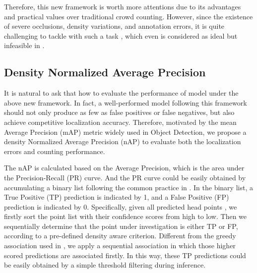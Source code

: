 \documentclass[10pt,twocolumn,letterpaper]{article}
\begin{document}
Therefore, this new framework is worth more attentions due to its advantages and practical values over traditional crowd counting. However, since the existence of severe occlusions, density variations, and annotation errors, it is quite challenging to tackle with such a task \cite{liu2019recurrent,liu2019point,sam2020locate}, which even is considered as ideal but infeasible in \cite{idrees2018composition}. 
\subsection{Density Normalized Average Precision}\label{label_metric}
It is natural to ask that how to evaluate the performance of model  under the above new framework. In fact, a well-performed model following this framework should not only produce as few as false positives or false negatives, but also achieve competitive localization accuracy. Therefore, motivated by the mean Average Precision (mAP) \cite{lin2014microsoft} metric widely used in Object Detection, we propose a density Normalized Average Precision (nAP) to evaluate both the localization errors and counting performance. 

The nAP is calculated based on the Average Precision, which is the area under the Precision-Recall (PR) curve. And the PR curve could be easily obtained by accumulating a binary list following the common practice in \cite{lin2014microsoft}. In the binary list, a True Positive (TP) prediction is indicated by 1, and a False Positive (FP) prediction is indicated by 0. Specifically, given all predicted head points , we firstly sort the point list with their confidence scores from high to low. Then we sequentially determine that the point under investigation is either TP or FP, according to a pre-defined density aware criterion. Different from the greedy association used in \cite{idrees2018composition,sam2020locate}, we apply a sequential association in which those higher scored predictions are associated firstly. In this way, these TP predictions could be easily obtained by a simple threshold filtering during inference.
\end{document}
